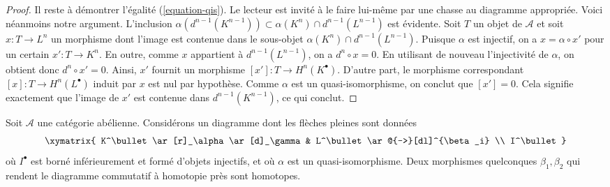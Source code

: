 \begin{proof}
\medskip\noindent
Il reste à démontrer l'égalité (\ref{equation-qis}). Le lecteur est invité à le
faire lui-même par une chasse au diagramme appropriée. Voici néanmoins notre
argument. L'inclusion
$\alpha(d^{n - 1}(K^{n - 1})) \subset \alpha(K^n) \cap
d^{n - 1}(L^{n - 1})$ est évidente. Soit $T$ un objet de $\mathcal{A}$ et soit
$x : T \to L^n$ un morphisme dont l'image est contenue dans le sous-objet
$\alpha(K^n) \cap d^{n - 1}(L^{n - 1})$. Puisque $\alpha$ est injectif, on a
$x = \alpha \circ x'$ pour un certain $x' : T \to K^n$. En outre, comme $x$
appartient à $d^{n - 1}(L^{n - 1})$, on a $d^n \circ x = 0$. En utilisant de
nouveau l'injectivité de $\alpha$, on obtient donc $d^n \circ x' = 0$. Ainsi,
$x'$ fournit un morphisme $[x'] : T \to H^n(K^\bullet)$. D'autre part, le
morphisme correspondant $[x] : T \to H^n(L^\bullet)$ induit par $x$ est nul
par hypothèse. Comme $\alpha$ est un quasi-isomorphisme, on conclut que
$[x'] = 0$. Cela signifie exactement que l'image de $x'$ est contenue dans
$d^{n - 1}(K^{n - 1})$, ce qui conclut.
\end{proof}

\begin{lemma}
\label{lemma-morphisms-equal-up-to-homotopy}
Soit $\mathcal{A}$ une catégorie abélienne. Considérons un diagramme dont les
flèches pleines sont données
$$
\xymatrix{
K^\bullet \ar[r]_\alpha \ar[d]_\gamma & L^\bullet \ar@{-->}[dl]^{\beta_i} \\
I^\bullet
}
$$
où $I^\bullet$ est borné inférieurement et formé d'objets injectifs, et où
$\alpha$ est un quasi-isomorphisme. Deux morphismes quelconques
$\beta_1, \beta_2$ qui rendent le diagramme commutatif à homotopie près sont
homotopes.
\end{lemma}

